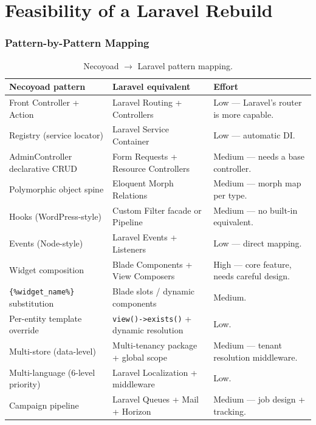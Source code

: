 \documentclass[11pt,a4paper]{article}
\begin{document}
\part{Feasibility of a Laravel Rebuild}\label{part:laravel}

\section{Pattern-by-Pattern Mapping}\label{sec:mapping}

\begin{table}[htbp]
\centering
\caption{Necoyoad $\to$ Laravel pattern mapping.}\label{tab:laravel-mapping}
\footnotesize\sloppy
\begin{tabularx}{\columnwidth}{>{\raggedright\arraybackslash}p{4.0cm}>{\raggedright\arraybackslash}p{4.5cm}X}
\toprule
\textbf{Necoyoad pattern} & \textbf{Laravel equivalent} & \textbf{Effort} \\
\midrule
Front Controller + Action & Laravel Routing + Controllers & Low --- Laravel's router is more capable. \\
Registry (service locator) & Laravel Service Container & Low --- automatic DI. \\
AdminController declarative CRUD & Form Requests + Resource Controllers & Medium --- needs a base controller. \\
Polymorphic object spine & Eloquent Morph Relations & Medium --- morph map per type. \\
Hooks (WordPress-style) & Custom Filter facade or Pipeline & Medium --- no built-in equivalent. \\
Events (Node-style) & Laravel Events + Listeners & Low --- direct mapping. \\
Widget composition & Blade Components + View Composers & High --- core feature, needs careful design. \\
\texttt{\{\%widget\_name\%\}} substitution & Blade slots / dynamic components & Medium. \\
Per-entity template override & \texttt{view()->exists()} + dynamic resolution & Low. \\
Multi-store (data-level) & Multi-tenancy package + global scope & Medium --- tenant resolution middleware. \\
Multi-language (6-level priority) & Laravel Localization + middleware & Low. \\
Campaign pipeline & Laravel Queues + Mail + Horizon & Medium --- job design + tracking. \\

\end{tabularx}
\end{table}
\end{document}
